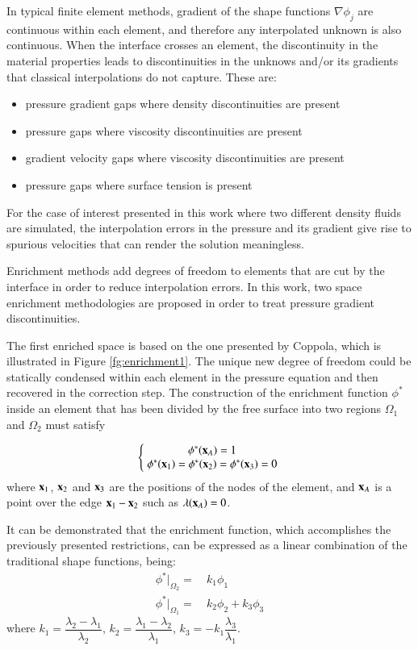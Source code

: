 In typical finite element methods, gradient of the shape functions $\nabla\phi_j$ are continuous within each element, and therefore any interpolated unknown is also continuous. When the interface crosses an element, the discontinuity in the material properties leads to discontinuities in the unknows and/or its gradients that classical interpolations do not capture. These are:
\begin{itemize}
\item pressure gradient gaps where density discontinuities are present\cite{Coppola05}
\item pressure gaps where viscosity discontinuities are present\cite{Idelsohn10}
\item gradient velocity gaps where viscosity discontinuities are present
\item pressure gaps where surface tension is present
\end{itemize}
For the case of interest presented in this work where two different density fluids are simulated, the interpolation errors in the pressure and its gradient give rise to spurious velocities that can render the solution meaningless.

Enrichment methods add degrees of freedom to elements that are cut by the interface in order to reduce interpolation errors. In this work, two space enrichment methodologies are proposed in order to treat pressure gradient discontinuities.

The first enriched space is based on the one presented by Coppola\cite{Coppola05}, which is illustrated in Figure \ref{fg:enrichment1}. The unique new degree of freedom could be statically condensed within each element in the pressure equation and then recovered in the correction step. The construction of the enrichment function $\phi^*$ inside an element that has been divided by the free surface into two regions $\Omega_1$ and $\Omega_2$ must satisfy

\begin{equation}
   \left\{\;
   \begin{matrix}
      \phi^*(\mathbf{x}_A)= 1 \\
      \phi^*(\mathbf{x}_1)= \phi^*(\mathbf{x}_2)=\phi^*(\mathbf{x}_3)= 0
   \end{matrix}\;
   \right.
   \label{eq:enrich-1a}
\end{equation}
where $\mathbf{x}_1$, $\mathbf{x}_2$ and $\mathbf{x}_3$ are the positions of the nodes of the element, and $\mathbf{x}_A$ is a point over the edge $\mathbf{x}_1-\mathbf{x}_2$ such as $\lambda(\mathbf{x}_A)=0$.

It can be demonstrated\cite{Coppola05} that the enrichment function, which accomplishes the previously presented restrictions, can be expressed as a linear combination of the traditional shape functions, being:
 \begin{align}
    \phi^*|_{\Omega_2} = & \ k_1 \phi_1 \label{phi_enrichment-2}\\
    \phi^*|_{\Omega_1} = & \ k_2 \phi_2 + k_3 \phi_3 \label{phi_enrichment-1}
  \end{align}
where $k_1 = \dfrac{\lambda_2-\lambda_1}{\lambda_2}$, $k_2 = \dfrac{\lambda_1-\lambda_2}{\lambda_1}$, 
$k_3 = -k_1\dfrac{\lambda_3}{\lambda_1}$.

